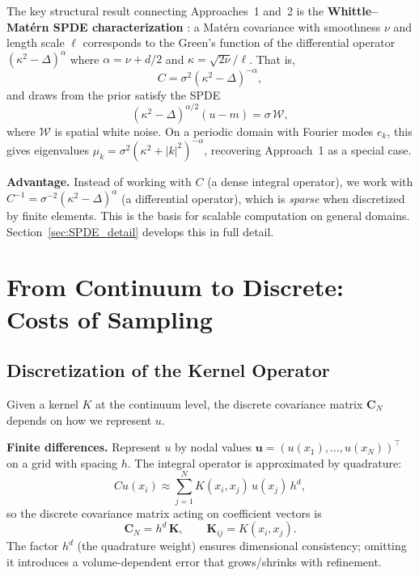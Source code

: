 \documentclass[11pt]{article}
\newcommand{\Cov}{\mathbf{C}}
\newcommand{\bK}{\mathbf{K}}
\newcommand{\bu}{\mathbf{u}}
\begin{document}
The key structural result connecting Approaches~1 and~2 is the \textbf{Whittle--Mat\'ern SPDE characterization} \cite{Whittle1963,LindgrenRueLindstrom2011}: a Mat\'ern covariance with smoothness $\nu$ and length scale $\ell$ corresponds to the Green's function of the differential operator $(\kappa^2 - \Delta)^{\alpha}$ where $\alpha = \nu + d/2$ and $\kappa = \sqrt{2\nu}/\ell$.  That is,
\[
  C = \sigma^2 (\kappa^2 - \Delta)^{-\alpha},
\]
and draws from the prior satisfy the SPDE
\[
  (\kappa^2 - \Delta)^{\alpha/2}(u - m) = \sigma\, \mathcal{W},
\]
where $\mathcal{W}$ is spatial white noise.  On a periodic domain with Fourier modes $e_k$, this gives eigenvalues $\mu_k = \sigma^2(\kappa^2 + |k|^2)^{-\alpha}$, recovering Approach~1 as a special case.

\medskip\noindent\textbf{Advantage.}  Instead of working with $C$ (a dense integral operator), we work with $C^{-1} = \sigma^{-2}(\kappa^2 - \Delta)^{\alpha}$ (a differential operator), which is \emph{sparse} when discretized by finite elements.  This is the basis for scalable computation on general domains.  Section~\ref{sec:SPDE_detail} develops this in full detail.


\section{From Continuum to Discrete: Costs of Sampling}\label{sec:discrete}

\subsection{Discretization of the Kernel Operator}\label{sec:disc_kernel}

Given a kernel $K$ at the continuum level, the discrete covariance matrix $\Cov_N$ depends on how we represent $u$.

\medskip\noindent\textbf{Finite differences.}  Represent $u$ by nodal values $\bu = (u(x_1),\ldots,u(x_N))^\top$ on a grid with spacing $h$.  The integral operator is approximated by quadrature:
\[
  Cu(x_i) \approx \sum_{j=1}^N K(x_i, x_j)\, u(x_j)\, h^d,
\]
so the discrete covariance matrix acting on coefficient vectors is
\[
  \Cov_N = h^d\, \bK, \qquad \bK_{ij} = K(x_i, x_j).
\]
The factor $h^d$ (the quadrature weight) ensures dimensional consistency; omitting it introduces a volume-dependent error that grows/shrinks with refinement.
\end{document}
